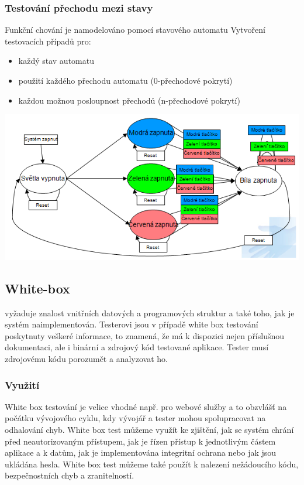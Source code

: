 \documentclass{article}
\begin{document}
\subsubsection{Testování přechodu mezi stavy}
Funkční chování je namodelováno pomocí stavového automatu\newline
Vytvoření testovacích případů pro:
\begin{itemize}
    \item každý stav automatu
    \item použití každého přechodu automatu (0-přechodové pokrytí)
    \item každou možnou posloupnost přechodů (n-přechodové pokrytí)
\end{itemize}
\includegraphics{test}   
\subsection{White-box}
vyžaduje znalost vnitřních datových a programových struktur a také toho, jak je systém naimplementován. Testerovi jsou v případě white box testování poskytnuty veškeré informace, to znamená, že má k dispozici nejen příslušnou dokumentaci, ale i binární a zdrojový kód testované aplikace. Tester musí zdrojovému kódu porozumět a analyzovat ho.
\subsubsection{Využití}
White box testování je velice vhodné např. pro webové služby a to obzvlášť na počátku vývojového cyklu, kdy vývojář a tester mohou spolupracovat na odhalování chyb. White box test můžeme využít ke zjištění, jak se systém chrání před neautorizovaným přístupem, jak je řízen přístup k jednotlivým částem aplikace a k datům, jak je implementována integritní ochrana nebo jak jsou ukládána hesla. White box test můžeme také použít k nalezení nežádoucího kódu, bezpečnostních chyb a zranitelností.
\end{document}
